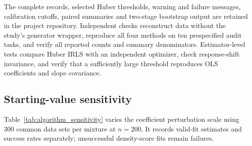 
\clearpage

\clearpage


The complete records, selected Huber thresholds, warning and failure messages, calibration cutoffs, paired summaries and two-stage bootstrap output are retained in the project repository. Independent checks reconstruct data without the study's generator wrapper, reproduce all four methods on ten prespecified audit tasks, and verify all reported counts and summary denominators. Estimator-level tests compare Huber IRLS with an independent optimizer, check response-shift invariance, and verify that a sufficiently large threshold reproduces OLS coefficients and slope covariance.

\FloatBarrier
\subsection{Starting-value sensitivity}

Table~\ref{tab:algorithm_sensitivity} varies the coefficient perturbation scale using 300 common data sets per mixture at $n=200$. It records valid-fit estimates and success rates separately; unsuccessful density-score fits remain failures.


\FloatBarrier
